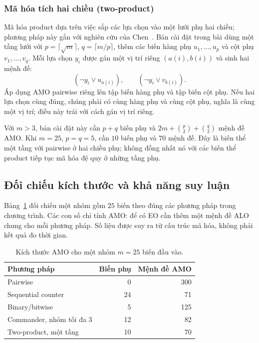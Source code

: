 \documentclass[a4paper,fleqn]{cas-sc}
\begin{document}
\subsubsection{Mã hóa tích hai chiều (two-product)}

Mã hóa product dựa trên việc sắp các lựa chọn vào một lưới phụ hai chiều;
phương pháp này gắn với nghiên cứu của Chen~.
Bản cài đặt trong bài dùng một tầng lưới với
$p=\lceil\sqrt{m}\rceil$, $q=\lceil m/p\rceil$, thêm các biến hàng phụ
$u_1,\ldots,u_p$ và cột phụ $v_1,\ldots,v_q$. Mỗi lựa chọn $y_i$ được
gán một vị trí riêng $(a(i),b(i))$ và sinh hai mệnh đề:
\begin{equation}
 (\neg y_i\lor u_{a(i)}),
 \qquad(\neg y_i\lor v_{b(i)}).
 \label{eq:theory-product}
\end{equation}
Áp dụng AMO pairwise riêng lên tập biến hàng phụ và tập biến cột phụ.
Nếu hai lựa chọn cùng đúng, chúng phải có cùng hàng phụ và cùng cột phụ,
nghĩa là cùng một vị trí; điều này trái với cách gán vị trí riêng.

Với $m>3$, bản cài đặt này cần $p+q$ biến phụ và
$2m+\binom{p}{2}+\binom{q}{2}$ mệnh đề AMO. Khi $m=25$, $p=q=5$,
cần $10$ biến phụ và $70$ mệnh đề. Đây là biến thể một tầng với pairwise
ở hai chiều phụ; không đồng nhất nó với các biến thể product tiếp tục
mã hóa đệ quy ở những tầng phụ.

\subsection{Đối chiếu kích thước và khả năng suy luận}

Bảng~\ref{tab:theory-amo-counts} đối chiếu một nhóm gồm $25$ biến theo
đúng các phương pháp trong chương trình. Các con số chỉ tính AMO:
để có EO cần thêm một mệnh đề ALO chung cho mỗi phương pháp. Số liệu
được suy ra từ cấu trúc mã hóa, không phải kết quả đo thời gian.

\begin{table}[htbp]
 \centering
 \caption{Kích thước AMO cho một nhóm $m=25$ biến đầu vào.}
 \label{tab:theory-amo-counts}
 \begin{tabular}{lrr}
  \toprule
  Phương pháp & Biến phụ & Mệnh đề AMO \\
  \midrule
  Pairwise & 0 & 300 \\
  Sequential counter & 24 & 71 \\
  Binary/bitwise & 5 & 125 \\
  Commander, nhóm tối đa 3 & 12 & 82 \\
  Two-product, một tầng & 10 & 70 \\
  \bottomrule
 \end{tabular}
\end{table}
\end{document}
